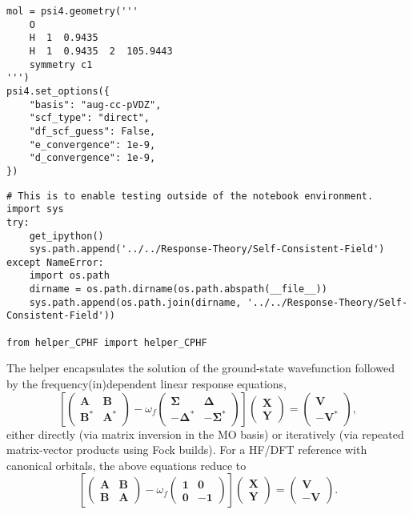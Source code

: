 \begin{verbatim}
mol = psi4.geometry('''
    O
    H  1  0.9435
    H  1  0.9435  2  105.9443
    symmetry c1
''')
psi4.set_options({
    "basis": "aug-cc-pVDZ",
    "scf_type": "direct",
    "df_scf_guess": False,
    "e_convergence": 1e-9,
    "d_convergence": 1e-9,
})
\end{verbatim}
\begin{verbatim}
# This is to enable testing outside of the notebook environment.
import sys
try:
    get_ipython()
    sys.path.append('../../Response-Theory/Self-Consistent-Field')
except NameError:
    import os.path
    dirname = os.path.dirname(os.path.abspath(__file__))
    sys.path.append(os.path.join(dirname, '../../Response-Theory/Self-Consistent-Field'))

from helper_CPHF import helper_CPHF
\end{verbatim}
The helper encapsulates the solution of the ground-state wavefunction followed by the frequency\textendash{}(in)dependent linear response equations,
\begin{equation}
  \left[
    \begin{pmatrix}
      \mathbf{A} & \mathbf{B} \\
      \mathbf{B}^{*} & \mathbf{A}^{*}
    \end{pmatrix}
    - \omega_{f}
    \begin{pmatrix}
      \mathbf{\Sigma} & \mathbf{\Delta} \\
      -\mathbf{\Delta}^{*} & -\mathbf{\Sigma}^{*}
    \end{pmatrix}
  \right]
  \begin{pmatrix}
    \mathbf{X} \\
    \mathbf{Y}
  \end{pmatrix}
  =
  \begin{pmatrix}
    \mathbf{V} \\
    -\mathbf{V}^{*}
  \end{pmatrix}
  ,
\end{equation}
either directly (via matrix inversion in the MO basis) or iteratively (via repeated matrix-vector products using Fock builds). For a HF/DFT reference with canonical orbitals, the above equations reduce to
\begin{equation}
  \left[
    \begin{pmatrix}
      \mathbf{A} & \mathbf{B} \\
      \mathbf{B} & \mathbf{A}
    \end{pmatrix}
    - \omega_{f}
    \begin{pmatrix}
      \mathbf{1} & \mathbf{0} \\
      \mathbf{0} & -\mathbf{1}
    \end{pmatrix}
  \right]
  \begin{pmatrix}
    \mathbf{X} \\
    \mathbf{Y}
  \end{pmatrix}
  =
  \begin{pmatrix}
    \mathbf{V} \\
    -\mathbf{V}
  \end{pmatrix}
  . \tag{Neese 107}
\end{equation}
